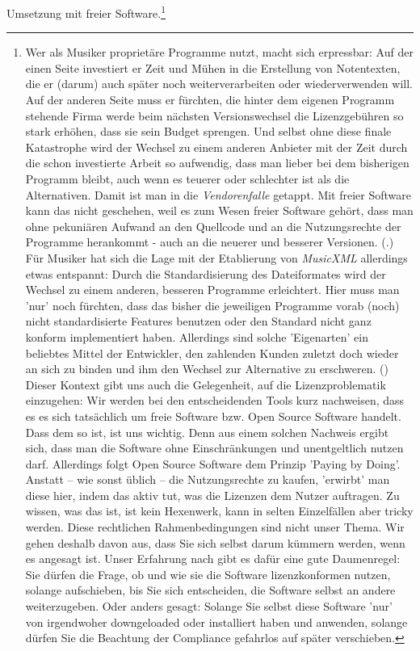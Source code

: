 Umsetzung mit freier Software.\footnote{Wer als Musiker proprietäre Programme
nutzt, macht sich erpressbar: Auf der einen Seite investiert er Zeit und Mühen
in die Erstellung von Notentexten, die er (darum) auch später noch
weiterverarbeiten oder wiederverwenden will. Auf der anderen Seite muss er
fürchten, die hinter dem eigenen Programm stehende Firma werde beim nächsten
Versionswechsel die Lizenzgebühren so stark erhöhen, dass sie sein Budget
sprengen. Und selbst ohne diese finale Katastrophe wird der Wechsel zu einem
anderen Anbieter mit der Zeit durch die schon investierte Arbeit so aufwendig,
dass man lieber bei dem bisherigen Programm bleibt, auch wenn es teuerer oder
schlechter ist als die Alternativen. Damit ist man in die \textit{Vendorenfalle}
getappt. Mit freier Software kann das nicht geschehen, weil es zum Wesen freier
Software gehört, dass man ohne pekuniären Aufwand an den Quellcode und an die
Nutzungsrechte der Programme herankommt - auch an die neuerer und besserer
Versionen. (\cite[vgl. dazu][\nopage wp]{FSF2018a}.) Für Musiker hat sich die
Lage mit der Etablierung von \textit{MusicXML} allerdings etwas entspannt: Durch
die Standardisierung des Dateiformates wird der Wechsel zu einem anderen,
besseren Programme erleichtert. Hier muss man 'nur' noch fürchten, dass das
bisher die jeweiligen Programme vorab (noch) nicht standardisierte Features
benutzen oder den Standard nicht ganz konform implementiert haben. Allerdings
sind solche 'Eigenarten' ein beliebtes Mittel der Entwickler, den zahlenden
Kunden zuletzt doch wieder an sich zu binden und ihm den Wechsel zur Alternative
zu erschweren. (\cite[Zur Lizenzierung von MusicXML vgl. auch][\nopage
wp.]{WpedMusicXML2018a}) Dieser Kontext gibt uns auch die Gelegenheit, auf
die Lizenzproblematik einzugehen: Wir werden bei den entscheidenden Tools kurz
nachweisen, dass es es sich tatsächlich um freie Software bzw. Open Source
Software handelt. Dass dem so ist, ist uns wichtig. Denn aus einem solchen
Nachweis ergibt sich, dass man die Software ohne Einschränkungen und
unentgeltlich nutzen darf. Allerdings folgt Open Source Software dem Prinzip
'Paying by Doing'. Anstatt -- wie sonst üblich -- die Nutzungsrechte zu kaufen,
'erwirbt' man diese hier, indem das aktiv tut, was die Lizenzen dem Nutzer
auftragen. Zu wissen, was das ist, ist kein Hexenwerk, kann in selten
Einzelfällen aber tricky werden. Diese rechtlichen Rahmenbedingungen sind nicht
unser Thema. Wir gehen deshalb davon aus, dass Sie sich selbst darum kümmern
werden, wenn es angesagt ist. Unser Erfahrung nach gibt es dafür eine gute
Daumenregel: Sie dürfen die Frage, ob und wie sie die Software lizenzkonformen
nutzen, solange aufschieben, bis Sie sich entscheiden, die Software selbst an
andere weiterzugeben. Oder anders gesagt: Solange Sie selbst diese Software
'nur' von irgendwoher downgeloaded oder installiert haben und anwenden, solange
dürfen Sie die Beachtung der Compliance gefahrlos auf später verschieben.}

